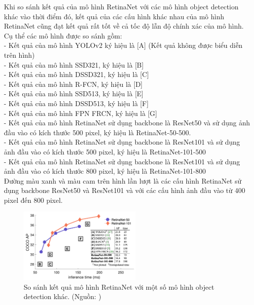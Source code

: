 {    Khi so sánh kết quả của mô hình RetinaNet với các mô hình object detection khác vào thời điểm đó, kết quả của các cấu hình khác nhau của mô hình RetinaNet cũng đạt kết quả rất tốt về cả tốc độ lẫn độ chính xác của mô hình.
    Cụ thể các mô hình được so sánh gồm: \\
    - Kết quả của mô hình YOLOv2 ký hiệu là [A] \cite{redmon2016yolo9000} (Kết quả không được biểu diễn trên hình) \\
    - Kết quả của mô hình SSD321, ký hiệu là [B] \cite{liu2016ssd} \\
    - Kết quả của mô hình DSSD321, ký hiệu là [C] \cite{fu2017dssd} \\
    - Kết quả của mô hình R-FCN, ký hiệu là [D] \cite{dai2016r} \\
    - Kết quả của mô hình SSD513, ký hiệu là [E] \cite{liu2016ssd} \\
    - Kết quả của mô hình DSSD513, ký hiệu là [F] \cite{fu2017dssd} \\
    - Kết quả của mô hình FPN FRCN, ký hiệu là [G] \cite{lin2017feature} \\
    - Kết quả của mô hình RetinaNet sử dụng backbone là ResNet50 và sử dụng ảnh đầu vào có kích thước 500 pixel, ký hiệu là RetinaNet-50-500. \\
    - Kết quả của mô hình RetinaNet sử dụng backbone là ResNet101 và sử dụng ảnh đầu vào có kích thước 500 pixel, ký hiệu là RetinaNet-101-500 \\
    - Kết quả của mô hình RetinaNet sử dụng backbone là ResNet101 và sử dụng ảnh đầu vào có kích thước 800 pixel, ký hiệu là RetinaNet-101-800 \\
    Đường màu xanh và màu cam trên hình lần lượt là các cấu hình RetinaNet sử dụng backbone ResNet50 và ResNet101 và với các cấu hình ảnh đầu vào từ 400 pixel đến 800 pixel.

    \begin{figure}[H]
        \centering
        \includegraphics[width=6cm] {images/retinanet_results_1}
        \caption{So sánh kết quả mô hình RetinaNet với một số mô hình object detection khác. (Nguồn: \cite{lin2017focal})}
        \label{fig:retinanet_results_1}
    \end{figure}

}

